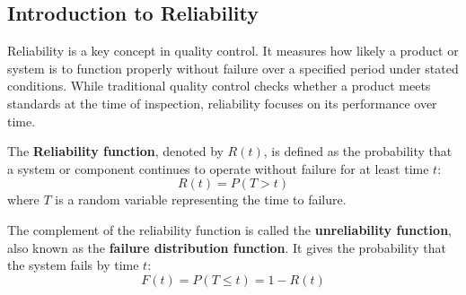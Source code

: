 \documentclass[twoside]{book}
\begin{document}
\begin{figure}[H]
\centering
{}
\end{figure}

\subsection{Introduction to Reliability}

Reliability is a key concept in quality control. It measures how likely a product or system is to function properly without failure over a specified period under stated conditions. While traditional quality control checks whether a product meets standards at the time of inspection, reliability focuses on its performance over time.

\begin{textbox}
The \textbf{Reliability function}, denoted by $R(t)$, is defined as the probability that a system or component continues to operate without failure for at least time $t$:
\begin{equation*}
R(t) = P(T > t)
\end{equation*}
where $T$ is a random variable representing the time to failure.
\end{textbox}

\medskip

The complement of the reliability function is called the \textbf{unreliability function}, also known as the \textbf{failure distribution function}. It gives the probability that the system fails by time $t$:
\begin{equation*}
F(t) = P(T \leq t) = 1 - R(t)
\end{equation*}
\end{document}
